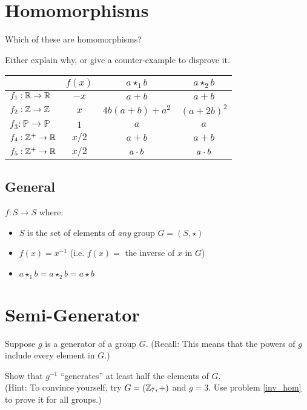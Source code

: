 \documentclass[12pt]{article}
\begin{document}
 
\section{Homomorphisms}

Which of these are homomorphisms?

Either explain why, or give a counter-example to disprove it.

\begin{center}
\begin{tabular}{|l|c|c|c|}
\hline
& $f(x)$ & $a \star_1 b$ & $a \star_2 b$ \\
\hline
$f_1 : \mathbb{R} \to \mathbb{R}$ & $-x$ & $a + b$ & $a + b$ \\
\hline
$f_2 : \mathbb{Z} \to \mathbb{Z}$ & $x$ & $4b(a + b) + a^2$ & $(a + 2b)^2$ \\
\hline
$f_3 : \mathbb{P} \to \mathbb{P}$ & $1$ & $a$ & $a$ \\
\hline
$f_4 : \mathbb{Z}^+ \to \mathbb{R}$ & $x / 2$ & $a + b$ & $a + b$ \\
\hline
$f_5 : \mathbb{Z}^+ \to \mathbb{R}$ & $x / 2$ & $a \cdot b$ & $a \cdot b$ \\
\hline
\end{tabular}
\end{center}


\subsection{General}

$f : S \to S$ where:
\label{inv_hom}
\begin{itemize}
\item $S$ is the set of elements of \emph{any} group $G = (S, \star)$
\item $f(x) = x^{-1}$ (i.e. $f(x) =$ the inverse of $x$ in $G$)
\item $a \star_1 b = a \star_2 b = a \star b$
\end{itemize}

\section{Semi-Generator}

Suppose $g$ is a generator of a group $G$. (Recall: This means that the powers of $g$ include every element in $G$.)

Show that $g^{-1}$ ``generates'' at least half the elements of $G$.\\

(Hint: To convince yourself, try $G = (\mathbb{Z}_7, +)$ and $g=3$. Use problem \ref{inv_hom} to prove it for all groups.)
\end{document}
